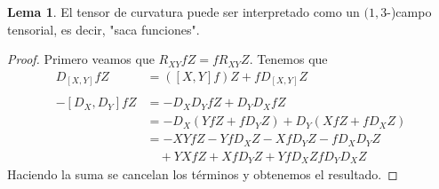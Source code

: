 \documentclass[spanish]{book}
\theoremstyle{definition}
\newtheorem*{lema}{Lema}
\begin{document}
	\begin{lema}
		El tensor de curvatura puede ser interpretado como un $(1,3$-)campo tensorial, es decir, "saca funciones".
	\end{lema}
	\begin{proof}
		Primero veamos que $R_{XY}fZ=fR_{XY}Z$. Tenemos que
		\begin{align*}
			D_[X,Y]fZ&=([X,Y]f)Z+fD_{[X,Y]}Z\\\\
			-[D_X,D_Y]fZ&=-D_XD_YfZ+D_YD_XfZ\\
			&=-D_X(YfZ+fD_YZ)+D_Y(XfZ+fD_XZ)\\
			&=-XYfZ-YfD_XZ-XfD_YZ-fD_XD_YZ\\
			&\quad+YXfZ+XfD_YZ+YfD_XZfD_YD_XZ
		\end{align*}
		Haciendo la suma se cancelan los términos y obtenemos el resultado.
	\end{proof}
	
\end{document}
